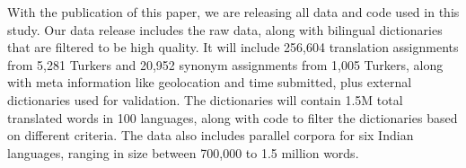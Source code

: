 \documentclass[11pt]{article}
\begin{document}
With the publication of this paper, we are releasing all data and code used in this study.  Our data release includes the raw data, along with bilingual dictionaries that are filtered to be high quality. It will include 256,604 translation assignments from 5,281 Turkers and 20,952 synonym assignments from 1,005 Turkers, along with meta information like geolocation and time submitted, plus external dictionaries used for validation. The dictionaries will contain 1.5M total translated words in 100 languages, along with code to filter the dictionaries based on different criteria.  The data also includes parallel corpora for six Indian languages, ranging in size between 700,000 to 1.5 million words.

 



\end{document}

